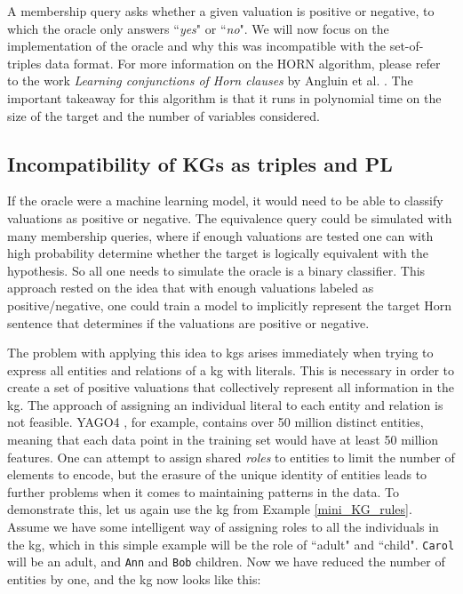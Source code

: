 A membership query asks whether a given valuation is positive or negative, to which the oracle only answers ``\textit{yes}" or ``\textit{no}". We will now focus on the implementation of the oracle and why this was incompatible with the set-of-triples data format. For more information on the HORN algorithm, please refer to the work \textit{Learning conjunctions of Horn clauses} by Angluin et al. \cite{DBLP:journals/ml/AngluinFP92}. The important takeaway for this algorithm is that it runs in polynomial time on the size of the target and the number of variables considered.


\subsection{Incompatibility of KGs as triples and PL}
If the oracle were a machine learning model, it would need to be able to classify valuations as positive or negative. The equivalence query could be simulated with many membership queries, where if enough valuations are tested one can with high probability determine whether the target is logically equivalent with the hypothesis. So all one needs to simulate the oracle is a binary classifier. This approach rested on the idea that with enough valuations labeled as positive/negative, one could train a model to implicitly represent the target Horn sentence that determines if the valuations are positive or negative. 

The problem with applying this idea to \glspl{kg} arises immediately when trying to express all entities and relations of a \gls{kg} with literals. This is necessary in order to create a set of positive valuations that collectively represent all information in the \gls{kg}. The approach of assigning an individual literal to each entity and relation is not feasible. YAGO4 \cite{yago4}, for example, contains over 50 million distinct entities, meaning that each data point in the training set would have at least 50 million features. One can attempt to assign shared \textit{roles} to entities to limit the number of elements to encode, but the erasure of the unique identity of entities leads to further problems when it comes to maintaining patterns in the data. To demonstrate this, let us again use the \gls{kg} from Example \ref{mini_KG_rules}. Assume we have some intelligent way of assigning roles to all the individuals in the \gls{kg}, which in this simple example will be the role of ``adult" and ``child". \texttt{Carol} will be an adult, and \texttt{Ann} and \texttt{Bob} children. Now we have reduced the number of entities by one, and the \gls{kg} now looks like this:

